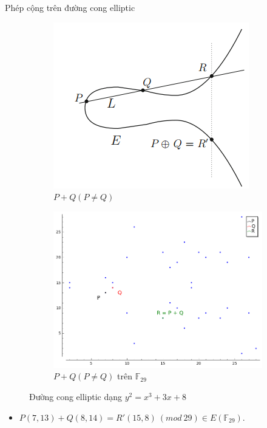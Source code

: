 \documentclass[compress]{beamer}
\begin{document}
\begin{frame}{Phép cộng trên đường cong elliptic}
\begin{figure}[h]
\begin{subfigure}{.5\textwidth}
  \centering
  \includegraphics[width=0.85\linewidth]{../im2.png}
  \caption{$P + Q (P \neq Q)$}
  \label{fig:sfig1}
\end{subfigure}%
\begin{subfigure}{.5\textwidth}
  \centering
  \includegraphics[width=1\linewidth]{../im13.png}
  \caption{$P + Q (P \neq Q)$ trên $\mathbb{F}_{29}$}
  \label{fig:sfig2}
\end{subfigure}
\caption*{Đường cong elliptic dạng $y^2 = x^3 + 3x + 8$}
\label{fig:fig}
\end{figure}
\begin{itemize}
\item \small{$P(7, 13) + Q(8, 14) = R'(15, 8) \ (mod \ 29)\in E(\mathbb{F}_{29})$}.
\end{itemize}
\end{frame}
\end{document}
